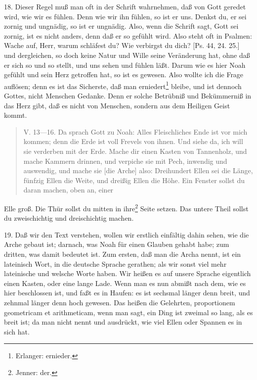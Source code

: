 18. Dieser Regel muß man oft in der Schrift wahrnehmen, daß von Gott geredet wird, wie wir es fühlen. Denn wie wir ihn fühlen, so ist er uns. Denkst du, er sei zornig und ungnädig, so ist er ungnädig. Also, wenn die Schrift sagt, Gott sei zornig, ist es nicht anders, denn daß er so gefühlt wird. Also steht oft in Psalmen: Wache auf, Herr, warum schläfest du? Wie verbirgst du dich? [Ps. 44, 24. 25.] und dergleichen, so doch keine Natur und Wille seine Veränderung hat, ohne daß er sich so und so stellt, und uns sehen und fühlen läßt. Darum wie es hier Noah gefühlt und sein Herz getroffen hat, so ist es gewesen. Also wollte ich die Frage auflösen; denn es ist das Sicherste, daß man erniedert\footnote{Erlanger: ernieder.} bleibe, und ist dennoch Gottes, nicht Menschen Gedanke. Denn er solche Betrübniß und Bekümmerniß in das Herz gibt, daß es nicht von Menschen, sondern aus dem Heiligen Geist kommt.

\begin{quote}
V. 13—16. Da sprach Gott zu Noah: Alles Fleischliches Ende ist vor mich kommen; denn die Erde ist voll Frevels von ihnen. Und siehe da, ich will sie verderben mit der Erde. Mache dir einen Kasten von Tannenholz, und mache Kammern drinnen, und verpiche sie mit Pech, inwendig und auswendig, und mache sie [die Arche] also: Dreihundert Ellen sei die Länge, fünfzig Ellen die Weite, und dreißig Ellen die Höhe. Ein Fenster sollst du daran machen, oben an, einer
\end{quote}
Elle groß. Die Thür sollst du mitten in ihre\footnote{Jenner: der.} Seite setzen. Das untere Theil sollst du zweischichtig und dreischichtig machen.

19. Daß wir den Text verstehen, wollen wir erstlich einfältig dahin sehen, wie die Arche gebaut ist; darnach, was Noah für einen Glauben gehabt habe; zum dritten, was damit bedeutet ist. Zum ersten, daß man die Archa nennt, ist ein lateinisch Wort, in die deutsche Sprache gerathen; als wir sonst viel mehr lateinische und welsche Worte haben. Wir heißen es auf unsere Sprache eigentlich einen Kasten, oder eine lange Lade. Wenn man es nun abmißt nach dem, wie es hier beschlossen ist, und faßt es in Haufen: es ist sechsmal länger denn breit, und zehnmal länger denn hoch gewesen. Das heißen die Gelehrten, proportionem geometricam et arithmeticam, wenn man sagt, ein Ding ist zweimal so lang, als es breit ist; da man nicht nennt und ausdrückt, wie viel Ellen oder Spannen es in sich hat.

